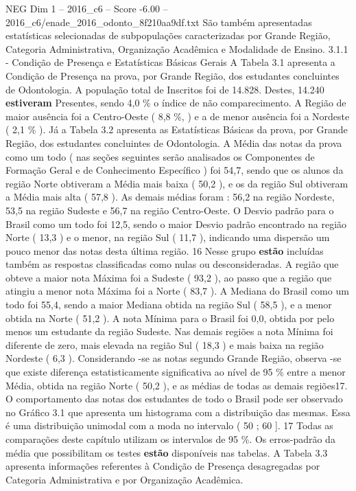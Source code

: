 \begin{textsample}{NEG Dim 1 – 2016\_c6 – Score -6.00 – 2016\_c6/enade\_2016\_odonto\_8f210aa9df.txt}
São também apresentadas estatísticas selecionadas de subpopulações caracterizadas por Grande Região, Categoria Administrativa, Organização Acadêmica e Modalidade de Ensino. 3.1.1 - Condição de Presença e Estatísticas Básicas Gerais A Tabela 3.1 apresenta a Condição de Presença na prova, por Grande Região, dos estudantes concluintes de Odontologia.
A população total de Inscritos foi de 14.828.
Destes, 14.240 \textbf{estiveram} Presentes, sendo 4,0 \% o índice de não comparecimento.
A Região de maior ausência foi a Centro-Oeste ( 8,8 \%, ) e a de menor ausência foi a Nordeste ( 2,1 \% ).
Já a Tabela 3.2 apresenta as Estatísticas Básicas da prova, por Grande Região, dos estudantes concluintes de Odontologia.
A Média das notas da prova como um todo ( nas seções seguintes serão analisados os Componentes de Formação Geral e de Conhecimento Específico ) foi 54,7, sendo que os alunos da região Norte obtiveram a Média mais baixa ( 50,2 ), e os da região Sul obtiveram a Média mais alta ( 57,8 ).
As demais médias foram : 56,2 na região Nordeste, 53,5 na região Sudeste e 56,7 na região Centro-Oeste.
O Desvio padrão para o Brasil como um todo foi 12,5, sendo o maior Desvio padrão encontrado na região Norte ( 13,3 ) e o menor, na região Sul ( 11,7 ), indicando uma dispersão um pouco menor das notas desta última região. 16 Nesse grupo \textbf{estão} incluídas também as respostas classificadas como nulas ou desconsideradas.
A região que obteve a maior nota Máxima foi a Sudeste ( 93,2 ), ao passo que a região que atingiu a menor nota Máxima foi a Norte ( 83,7 ).
A Mediana do Brasil como um todo foi 55,4, sendo a maior Mediana obtida na região Sul ( 58,5 ), e a menor obtida na Norte ( 51,2 ).
A nota Mínima para o Brasil foi 0,0, obtida por pelo menos um estudante da região Sudeste.
Nas demais regiões a nota Mínima foi diferente de zero, mais elevada na região Sul ( 18,3 ) e mais baixa na região Nordeste ( 6,3 ).
Considerando -se as notas segundo Grande Região, observa -se que existe diferença estatisticamente significativa ao nível de 95 \% entre a menor Média, obtida na região Norte ( 50,2 ), e as médias de todas as demais regiões17.
O comportamento das notas dos estudantes de todo o Brasil pode ser observado no Gráfico 3.1 que apresenta um histograma com a distribuição das mesmas.
Essa é uma distribuição unimodal com a moda no intervalo ( 50 ; 60 ]. 17 Todas as comparações deste capítulo utilizam os intervalos de 95 \%.
Os erros-padrão da média que possibilitam os testes \textbf{estão} disponíveis nas tabelas.
A Tabela 3.3 apresenta informações referentes à Condição de Presença desagregadas por Categoria Administrativa e por Organização Acadêmica.

\end{textsample}
